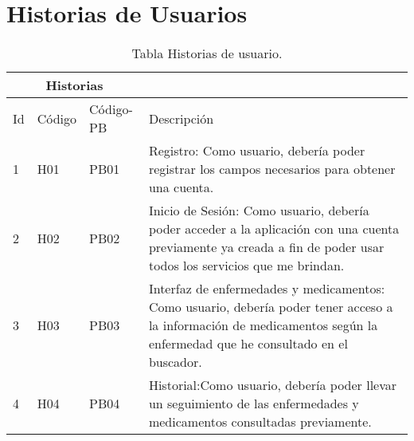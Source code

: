 \chapter{Historias de Usuarios}


\begin{table}[htb]
	\centering
	\begin{tabular}{|l|p{2.5cm}|p{1.5cm}|p{10cm}|}
		\hline
		\multicolumn{3}{|c|}{Historias} \\ \hline
		Id & Código& Código-PB & Descripción \\
		\hline \hline
		1 & H01 & PB01 & Registro: Como usuario, debería poder registrar los campos necesarios para obtener una cuenta.\\ \hline
		
		2 & H02 & PB02 & Inicio de Sesión: Como usuario, debería poder acceder a la aplicación con una cuenta previamente ya creada a fin de poder usar todos los servicios que me brindan.  \\ \hline
		
		3 & H03 & PB03 & Interfaz de enfermedades y medicamentos: 
		Como usuario, debería poder tener acceso a la información de medicamentos según la enfermedad que he consultado en el buscador.   \\ \hline
		
		4 & H04 & PB04 & Historial:Como usuario, debería poder llevar un seguimiento de las enfermedades y medicamentos consultadas previamente. \\ \hline
		
	
		
		
	
	\end{tabular}
	\caption{Tabla Historias de usuario.}
	\label{tabla:Historial}
\end{table}